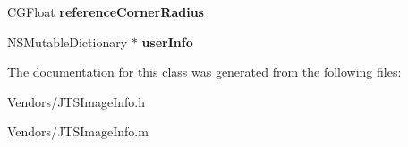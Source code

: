 \begin{DoxyCompactItemize}
\item 
\hypertarget{interface_j_t_s_image_info_aecfdf2789f83090b5accdb62dc746ca3}{}C\+G\+Float {\bfseries reference\+Corner\+Radius}\label{interface_j_t_s_image_info_aecfdf2789f83090b5accdb62dc746ca3}

\item 
\hypertarget{interface_j_t_s_image_info_ad2730c96239321fde966c781e7a2ada0}{}N\+S\+Mutable\+Dictionary $\ast$ {\bfseries user\+Info}\label{interface_j_t_s_image_info_ad2730c96239321fde966c781e7a2ada0}

\end{DoxyCompactItemize}


The documentation for this class was generated from the following files\+:\begin{DoxyCompactItemize}
\item 
Vendors/J\+T\+S\+Image\+Info.\+h\item 
Vendors/J\+T\+S\+Image\+Info.\+m\end{DoxyCompactItemize}
